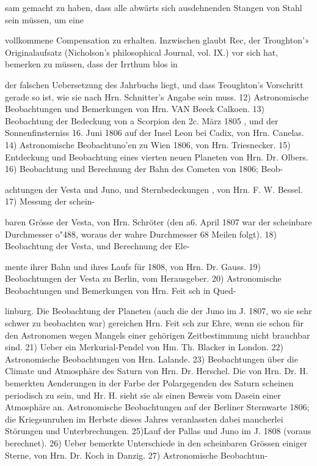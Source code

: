 \documentclass[10pt,a4paper]{article}
\begin{document}
sam gemacht zu haben, dass alle abwärts sich ausdehnenden Stangen von Stahl sein müssen, um eine

vollkommene Compensation zu erhalten. Inzwischen glaubt Rec, der Troughton'» Originalaufsatz (Nicholson's philosophical Journal, vol. IX.) vor sich hat, bemerken zu müssen, dass der Irrthum blos in

der falschen Uebersetzung des Jahrbuchs liegt, und dass Teoughton's Vorschritt gerade so ist, wie sie nach Hrn. Schnitter's Angabe sein muss. 12) Astronomische Beobachtungen und Bemerkungen von Hrn. VAN Beeck Calkoen. 13) Beobachtung der Bedeckung von a Scorpion den 2c. März 1805 , und der Sonnenfinsterniss 16. Juni 1806 auf der Insel Leon bei Cadix, von Hrn. Canelas. 14) Astronomische Beobachtuno'en zu Wien 1806, von Hrn. Triesnecker. 15) Entdeckung und Beobachtung eines vierten neuen Planeten von Hrn. Dr. Olbers. 16) Beobachtung und Berechnung der Bahn des Cometen von 1806; Beob-

achtungen der Vesta und Juno, und Sternbedeckungen , von Hrn. F. W. Bessel. 17) Messung der schein-

baren Grösse der Vesta, von Hrn. Schröter (den a6. April 1807 war der scheinbare Durchmesser o"488, woraus der wahre Durchmesser 68 Meilen folgt). 18) Beobachtung der Vesta, und Berechnung der Ele-

mente ihrer Bahn und ihres Laufs für 1808, von Hrn. Dr. Gauss. 19) Beobachtungen der Vesta zu Berlin, vom Herausgeber. 20) Astronomische Beobachtungen und Bemerkungen von Hrn. Feit sch in Qued-

linburg. Die Beobachtung der Planeten (auch die der Juno im J. 1807, wo sie sehr schwer zu beobachten war) gereichen Hrn. Feit sch zur Ehre, wenn sie schon für den Astronomen wegen Mangels einer gehörigen Zeitbestimmung nicht brauchbar sind. 21) Ueber ein Merkurial-Pendel von Hm. Th. Blacker in London. 22) Astronomische Beobachtungen von Hrn. Lalande. 23) Beobachtungen über die Climate und Atmosphäre des Saturn von Hrn. Dr. Herschel. Die von Hrn. Dr. H. bemerkten Aenderungen in der Farbe der Polargegenden des Saturn scheinen periodisch zu sein, und Hr. H. sieht sie als einen Beweis vom Dasein einer Atmosphäre an. Astronomische Beobachtungen auf der Berliner Sternwarte 1806; die Kriegsunruhen im Herbste dieses Jahres veranlassten dabei mancherlei Störungen und Unterbrechungen. 25)Lauf der Pallas und Juno im J. 1808 (voraus berechnet). 26) Ueber bemerkte Unterschiede in den scheinbaren Grössen einiger Sterne, von Hrn. Dr. Koch in Danzig. 27) Astronomische Beobachtun-
\end{document}
